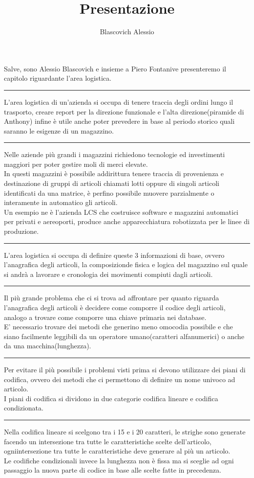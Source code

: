 \documentclass[a4paper]{article}
\title{Presentazione}
\author{Blascovich Alessio}
\date{}
\newcommand{\cambioSlide}{\vspace{1em} \hrule \vspace{1em}}
\begin{document}
	\maketitle
	Salve, sono Alessio Blascovich e insieme a Piero Fontanive presenteremo il capitolo riguardante l'area logistica.
	\cambioSlide
	L'area logistica di un'azienda si occupa di tenere traccia degli ordini lungo il trasporto, creare report per la direzione funzionale e l'alta direzione(piramide di Anthony) infine è utile anche poter prevedere in base al periodo storico quali saranno le esigenze di un magazzino.
	\cambioSlide
	Nelle aziende più grandi i magazzini richiedono tecnologie ed investimenti maggiori per poter gestire moli di merci elevate.\\
	In questi magazzini è possibile addirittura tenere traccia di provenienza e destinazione di gruppi di articoli chiamati lotti oppure di singoli articoli identificati da una matrice, è perfino possibile muovere parzialmente o interamente in automatico gli articoli.\\
	Un esempio ne è l'azienda LCS che costruisce software e magazzini automatici per privati e aereoporti, produce anche apparecchiatura robotizzata per le linee di produzione.
	\cambioSlide
	L'area logistica si occupa di definire queste 3 informazioni di base, ovvero l'anagrafica degli articoli, la composizionde fisica e logica del magazzino sul quale si andrà a lavorare e cronologia dei movimenti compiuti dagli articoli.
	\cambioSlide
	Il più grande problema che ci si trova ad affrontare per quanto riguarda l'anagrafica degli articoli è decidere come comporre il codice degli articoli, analogo a trovare come comporre una chiave primaria nei database.\\
	E' necessario trovare dei metodi che generino meno omocodia possibile e che siano facilmente leggibili da un operatore umano(caratteri alfanumerici) o anche da una macchina(lunghezza).
	\cambioSlide
	Per evitare il più possibile i problemi visti prima si devono utilizzare dei piani di codifica, ovvero dei metodi che ci permettono di definire un nome univoco ad articolo.\\
	I piani di codifica si dividono in due categorie codifica lineare e codifica condizionata.
	\cambioSlide
	Nella codifica lineare si scelgono tra i 15 e i 20 caratteri, le strighe sono generate facendo un intersezione tra tutte le caratteristiche scelte dell'articolo, ogniintersezione tra tutte le caratteristiche deve generare al più un articolo.\\
	Le codifiche condizionali invece la lunghezza non è fissa ma si sceglie ad ogni passaggio la nuova parte di codice in base alle scelte fatte in precedenza.
\end{document}
